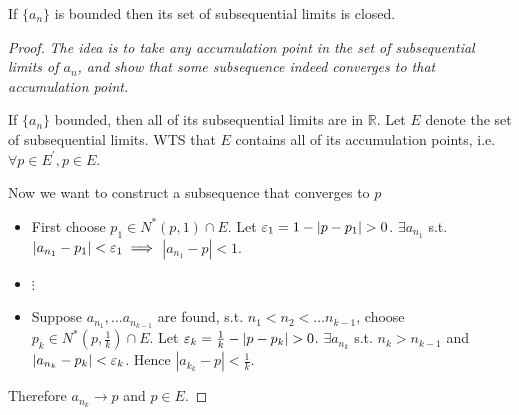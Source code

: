 \begin{proposition}
    If $\{ a_n \} $ is bounded then its set of subsequential limits is closed. 
\end{proposition}

\begin{proof}
    \textit{
        The idea is to take any accumulation point
        in the set of subsequential limits of $a_n$,
        and show that some subsequence indeed
        converges to that accumulation point.
    }
    \medskip

    If $\{ a_n \} $ bounded, 
    then all of its subsequential limits are in $\mathbb{R}$.
    Let $E$ denote the set of subsequential limits. 
    WTS that $E$ contains all of its accumulation points, 
    i.e. $\forall p \in E^{\prime}, p \in E$. 
    \medskip

    Now we want to construct a subsequence that 
    converges to $p$
    \begin{itemize}
        \item First choose $p_1 \in N^*(p, 1) \cap E$. 
    Let $\varepsilon_1 = 1 - |p-p_1| > 0$.
    $\exists a_{n_1}$ s.t. $|a_{n_1} - p_1| < \varepsilon_1 \implies$
    $|a_{n_1} - p| < 1$.
        \item $\vdots$
        \item 
    Suppose $a_{n_1} , \hdots a_{n_{k - 1}}$ are found, s.t. 
    $n_1 < n_2 < \hdots n_{k-1}$,
    choose $p_k \in N^*(p, \frac{1}{k}) \cap E$. 
    Let $\varepsilon_k = \frac{1}{k} - |p - p_k| > 0$.
    $\exists a_{n_k}$ s.t. $n_k > n_{k-1}$ and 
    $|a_{n_k} - p_k| < \varepsilon_k$. 
    Hence $|a_{k_k} - p| < \frac{1}{k}$. 
    \end{itemize} 

    Therefore $a_{n_k} \to p$ and $p \in E$.
\end{proof}



